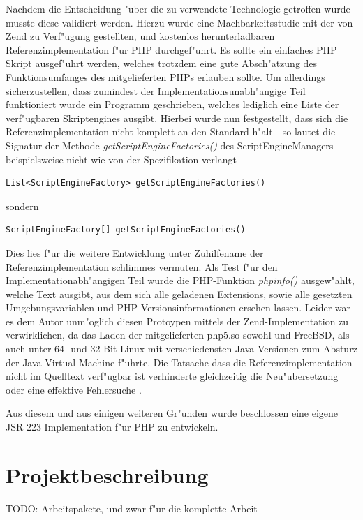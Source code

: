 Nachdem die Entscheidung "uber die zu verwendete Technologie getroffen wurde musste diese validiert werden. Hierzu wurde
eine Machbarkeitsstudie mit der von Zend zu Verf"ugung gestellten, und kostenlos herunterladbaren Referenzimplementation
f"ur PHP durchgef"uhrt. Es sollte ein einfaches PHP Skript ausgef"uhrt werden, welches trotzdem eine gute Absch"atzung
des Funktionsumfanges des mitgelieferten PHPs erlauben sollte. Um allerdings sicherzustellen, dass zumindest der 
Implementationsunabh"angige Teil funktioniert wurde ein Programm geschrieben, welches lediglich eine Liste der verf"ugbaren
Skriptengines ausgibt. Hierbei wurde nun festgestellt, dass sich die Referenzimplementation nicht komplett an den Standard
h"alt - so lautet die Signatur der Methode \emph{getScriptEngineFactories()} des ScriptEngineManagers beispielsweise 
nicht wie von der Spezifikation verlangt
\begin{lstlisting}[name=Vom Standard verlangte Signatur]
    List<ScriptEngineFactory> getScriptEngineFactories()
\end{lstlisting}
sondern
\begin{lstlisting}[name=Signatur in der Referenzimplementation]
    ScriptEngineFactory[] getScriptEngineFactories()
\end{lstlisting}
Dies lies f"ur die weitere Entwicklung unter Zuhilfename der Referenzimplementation schlimmes vermuten.
Als Test f"ur den Implementationabh"angigen Teil wurde die PHP-Funktion \emph{phpinfo()} ausgew"ahlt, welche
Text ausgibt, aus dem sich alle geladenen Extensions, sowie alle gesetzten Umgebungsvariablen und 
PHP-Versionsinformationen ersehen lassen. Leider war es dem Autor unm"oglich diesen Protoypen mittels der Zend-Implementation
zu verwirklichen, da das Laden der mitgelieferten php5.so sowohl und FreeBSD, als auch unter 64- und 32-Bit Linux mit 
verschiedensten Java Versionen zum Absturz der Java Virtual Machine f"uhrte. Die Tatsache dass die Referenzimplementation nicht
im Quelltext verf"ugbar ist verhinderte gleichzeitig die Neu"ubersetzung oder eine effektive Fehlersuche .

Aus diesem und aus einigen weiteren Gr"unden wurde beschlossen eine eigene JSR 223 Implementation f"ur PHP zu entwickeln.

\section{Projektbeschreibung}
\label{sec:chap1:project}

TODO: Arbeitspakete, und zwar f"ur die komplette Arbeit

